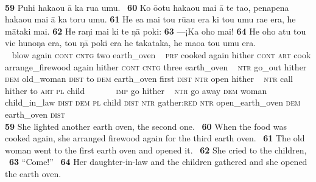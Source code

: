 ~

\bigskip\gll
\textbf{\textup{59}} Puhi haka{\ꞌ}ou {\ꞌ}ā ka rua {\ꞌ}umu. ~\textbf{\textup{60}} Ko {\ꞌ}ō{\ꞌ}otu haka{\ꞌ}ou mai {\ꞌ}ā te ta{\ꞌ}o, penapena haka{\ꞌ}ou mai {\ꞌ}ā ka toru {\ꞌ}umu. \textbf{\textup{61}} He e{\ꞌ}a mai tou rū{\ꞌ}au era ki tou {\ꞌ}umu ra{\ꞌ}e era, he mātaki mai. \textbf{\textup{62}} He raŋi mai ki te ŋā poki: \textbf{\textup{63}} —¡Ka oho mai! \textbf{\textup{64}} He oho atu tou vi{\ꞌ}e hunoŋa era, tou ŋā poki era he takataka, he ma{\ꞌ}oa tou {\ꞌ}umu era.\\
~ blow again \textsc{cont} \textsc{cntg} two earth\_oven ~ \textsc{prf} cooked again hither \textsc{cont} \textsc{art} cook arrange\_firewood again hither \textsc{cont} \textsc{cntg} three earth\_oven  ~ \textsc{ntr} go\_out hither \textsc{dem} old\_woman \textsc{dist} to \textsc{dem} earth\_oven first \textsc{dist} \textsc{ntr} open hither  ~ \textsc{ntr} call hither to \textsc{art} \textsc{pl} child ~ ~~~~~\textsc{imp} go hither  ~ \textsc{ntr} go away \textsc{dem} woman child\_in\_law \textsc{dist} \textsc{dem} \textsc{pl} child \textsc{dist} \textsc{ntr} gather:\textsc{red} \textsc{ntr} open\_earth\_oven \textsc{dem} earth\_oven \textsc{dist}\\

\medskip\glt
\textbf{\textup{59}} She lighted another earth oven, the second one. ~\textbf{\textup{60}} When the food was cooked again, she arranged firewood again for the third earth oven. ~\textbf{\textup{61}} The old woman went to the first earth oven and opened it. ~\textbf{\textup{62}} She cried to the children, ~\textbf{\textup{63}} “Come!” ~\textbf{\textup{64}} Her daughter-in-law and the children gathered and she opened the earth oven.


~

